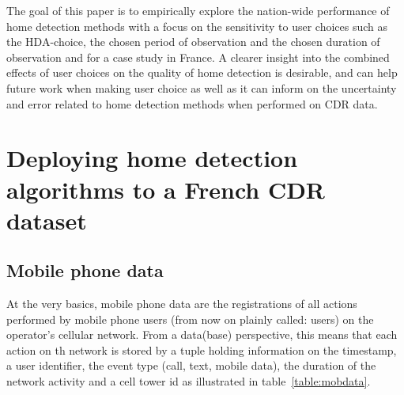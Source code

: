 \documentclass[a4paper]{article}
\begin{document}
The goal of this paper is to empirically explore the nation-wide performance of home detection methods with a focus on the sensitivity to user choices such as the HDA-choice, the chosen period of observation and the chosen duration of observation and for a case study in France. A clearer insight into the combined effects of user choices on the quality of home detection is desirable, and can help future work when making user choice as well as it can inform on the uncertainty and error related to home detection methods when performed on CDR data.  


\section{Deploying home detection algorithms to a French CDR dataset}

\subsection{Mobile phone data}

At the very basics, mobile phone data are the registrations of all actions performed by mobile phone users (from now on plainly called: users) on the operator's cellular network. From a data(base) perspective, this means that each action on th network is stored by a tuple holding information on the timestamp, a user identifier, the event type (call, text, mobile data), the duration of the network activity and a cell tower id as illustrated in table~\ref{table:mobdata}. 


\begin{table}[ht]
\medskip
\centering %
\caption[Example of records in a mobile phone dataset]{Example of potential records in a mobile phone dataset (either CDR or DDR data)}%
\label{table:mobdata} %
\end{table}
\end{document}
